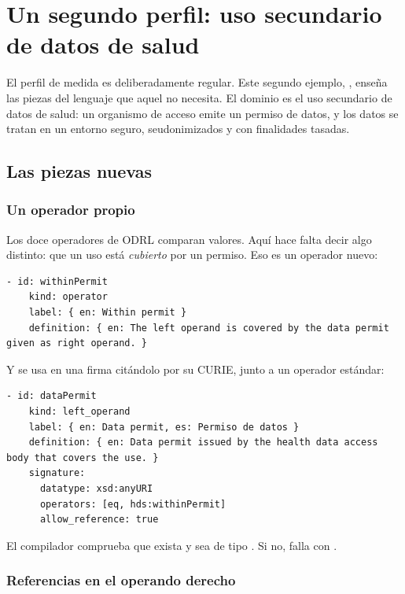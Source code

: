 \chapter{Un segundo perfil: uso secundario de datos de salud}
\label{ch:salud}

El perfil de medida es deliberadamente regular. Este segundo ejemplo, ,
enseña las piezas del lenguaje que aquel no necesita. El dominio es el uso secundario de datos de salud: un
organismo de acceso emite un permiso de datos, y los datos se tratan en un entorno seguro, seudonimizados y con
finalidades tasadas.

\section{Las piezas nuevas}

\subsection{Un operador propio}

Los doce operadores de ODRL comparan valores. Aquí hace falta decir algo distinto: que un uso está \emph{cubierto}
por un permiso. Eso es un operador nuevo:

\begin{lstlisting}[style=yaml]
  - id: withinPermit
    kind: operator
    label: { en: Within permit }
    definition: { en: The left operand is covered by the data permit given as right operand. }
\end{lstlisting}

Y se usa en una firma citándolo por su CURIE, junto a un operador estándar:

\begin{lstlisting}[style=yaml]
  - id: dataPermit
    kind: left_operand
    label: { en: Data permit, es: Permiso de datos }
    definition: { en: Data permit issued by the health data access body that covers the use. }
    signature:
      datatype: xsd:anyURI
      operators: [eq, hds:withinPermit]
      allow_reference: true
\end{lstlisting}

El compilador comprueba que  exista y sea de tipo . Si no, falla con
.

\subsection{Referencias en el operando derecho}

